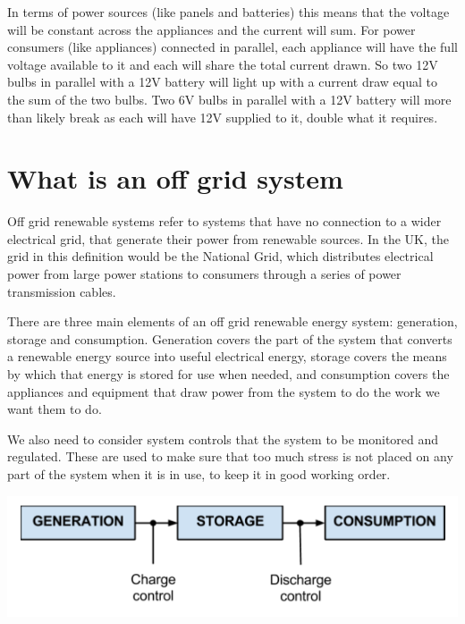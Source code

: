 \documentclass{article}
\theoremstyle{definition}
\theoremstyle{definition}
\theoremstyle{remark}
\begin{document}
    In terms of power sources (like panels and batteries) this means that the voltage will be constant across the appliances and the current will sum. For power consumers (like appliances) connected in parallel, each appliance will have the full voltage available to it and each will share the total current drawn. So two 12V bulbs in parallel with a 12V battery will light up with a current draw equal to the sum of the two bulbs. Two 6V bulbs in parallel with a 12V battery will more than likely break as each will have 12V supplied to it, double what it requires. 
  


{\color{blue}\section{What is an off grid system}} %
\label{sec:what_is_an_off_grid_system}

  Off grid renewable systems refer to systems that have no connection to a wider electrical grid, that generate their power from renewable sources. In the UK, the grid in this definition would be the National Grid, which distributes electrical power from large power stations to consumers through a series of power transmission cables.

  There are three main elements of an off grid renewable energy system: generation, storage and consumption. Generation covers the part of the system that converts a renewable energy source into useful electrical energy, storage covers the means by which that energy is stored for use when needed, and consumption covers the appliances and equipment that draw power from the system to do the work we want them to do.

  We also need to consider system controls that the system to be monitored and regulated. These are used to make sure that too much stress is not placed on any part of the system when it is in use, to keep it in good working order.

  \begin{center}
    \includegraphics[width=0.60\paperwidth]{Images/image_3_1_(off_grid_diagram).png}
  \end{center}
\end{document}
